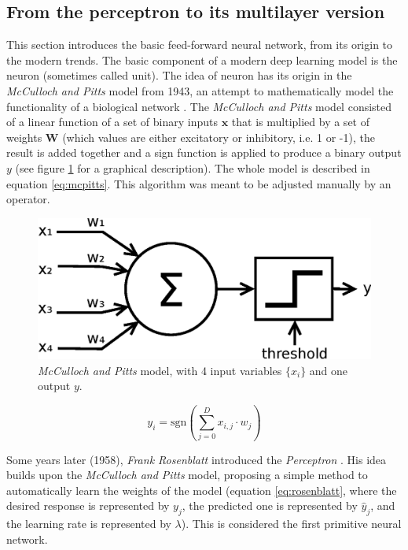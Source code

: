 \subsection{From the perceptron to its multilayer version} \label{sec:mlp}

This section introduces the basic feed-forward neural network, from its origin to the modern trends. The basic component of a modern deep learning model is the neuron (sometimes called unit). The idea of neuron has its origin in the \textit{McCulloch and Pitts} model from 1943, an attempt to mathematically model the functionality of a biological network \autocite{mccullochPitts1943}. The \textit{McCulloch and Pitts} model consisted of a linear function of a set of binary inputs $\mathbf{x}$ that is multiplied by a set of weights $\mathbf{W}$ (which values are either excitatory or inhibitory, i.e. 1 or -1), the result is added together and a sign function is applied to produce a binary output $y$ (see figure \ref{fig:mcpittsneuron} for a graphical description). The whole model is described in equation \ref{eq:mcpitts}. This algorithm was meant to be adjusted manually by an operator.

\begin{figure}
	\centering
	\includegraphics[width=0.60\linewidth]{chapter2/images/mcpittsneuron}
	\caption{\textit{McCulloch and Pitts} model, with 4 input variables $\{x_i\}$ and one output $y$.}
	\label{fig:mcpittsneuron}
\end{figure}

\begin{equation}
	\label{eq:mcpitts}
	y_i = \mathrm{sgn}\left(\sum_{j=0}^{D} x_{i,j} \cdot w_{j} \right)
\end{equation}

Some years later (1958), \textit{Frank Rosenblatt} introduced the \textit{Perceptron} \autocite{Rosenblatt58}. His idea builds upon the \textit{McCulloch and Pitts} model, proposing a simple method to automatically learn the weights of the model (equation \ref{eq:rosenblatt}, where the desired response is represented by $y_j$, the predicted one is represented by $\hat{y}_j$, and the learning rate is represented by $\lambda$). This is considered the first primitive neural network.

